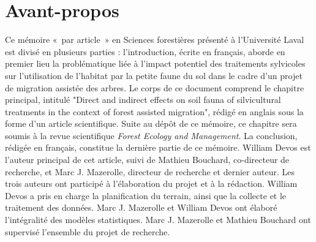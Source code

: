 \chapter*{Avant-propos}         %
\label{chap-avantpropos}        %


Ce mémoire « par article » en Sciences forestières présenté à l'Université Laval est divisé en plusieurs parties : 
l'introduction, écrite en français, aborde en premier lieu la problématique liée à l'impact potentiel des traitements sylvicoles sur 
l'utilisation de l'habitat par la petite faune du sol dans le cadre d'un projet de migration assistée des arbres.
Le corps de ce document comprend le chapitre principal, intitulé 
"Direct and indirect effects on soil fauna of silvicultural treatments in the context of forest assisted migration", rédigé en anglais sous la forme d'un article scientifique. 
Suite au dépôt de ce mémoire, ce chapitre sera soumis à la revue scientifique \textit{Forest Ecology and Management}. 
La conclusion, rédigée en français, constitue la dernière partie de ce mémoire.
William Devos est l'auteur principal de cet article, suivi de Mathieu Bouchard, co-directeur de recherche, et Marc J. Mazerolle, directeur de recherche et dernier auteur. 
Les trois auteurs ont participé à l'élaboration du projet et à la rédaction. 
William Devos a pris en charge la planification du terrain, ainsi que la collecte et le traitement des données.
Marc J. Mazerolle et William Devos ont élaboré l'intégralité des modèles statistiques.
Marc J. Mazerolle et Mathieu Bouchard ont supervisé l'ensemble du projet de recherche.
